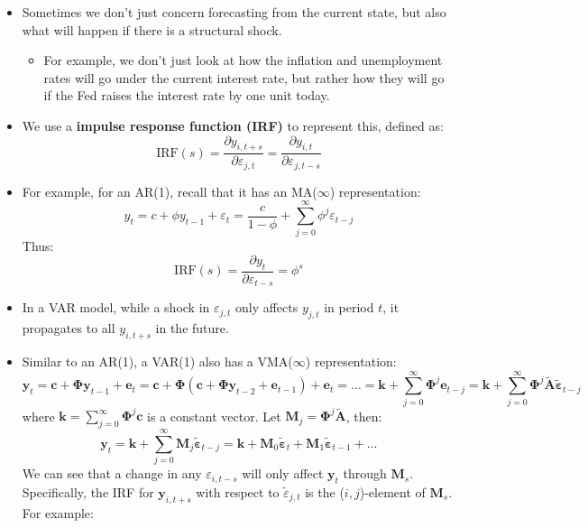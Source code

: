 \documentclass[notitlepage]{article}
\begin{document}
\begin{itemize}
    \item Sometimes we don't just concern forecasting from the current state, but also what will happen if there is a structural shock.
    \begin{itemize}
        \item For example, we don't just look at how the inflation and unemployment rates will go under the current interest rate, but rather how they will go if the Fed raises the interest rate by one unit today. 
    \end{itemize}
    \item We use a \textbf{impulse response function (IRF)} to represent this, defined as:
    \[
    \text{IRF}(s) = \frac{\partial y_{i, t+s}}{\partial \varepsilon_{j, t}} = \frac{\partial y_{i, t}}{\partial \varepsilon_{j, t-s}}
    \]
    \item For example, for an AR(1), recall that it has an MA(\(\infty\)) representation:
    \[
    y_t = c + \phi y_{t-1} + \varepsilon_t = \frac{c}{1-\phi} + \sum_{j=0}^\infty \phi^j \varepsilon_{t-j}
    \]
    Thus:
    \[
    \text{IRF}(s) = \frac{\partial y_{t}}{\partial \varepsilon_{t-s}} = \phi^s
    \]
    \item In a VAR model, while a shock in \(\varepsilon_{j,t}\) only affects \(y_{j,t}\) in period \(t\), it propagates to all \(y_{i,t+s}\) in the future.


    \item Similar to an AR(1), a VAR(1) also has a VMA(\(\infty\)) representation:
    \[
        \mathbf{y}_t = \mathbf{c} + \boldsymbol{\Phi}\mathbf{y}_{t-1} + \mathbf{e}_t 
        =\mathbf{c} + \boldsymbol{\Phi}(\mathbf{c} + \boldsymbol{\Phi}\mathbf{y}_{t-2} + \mathbf{e}_{t-1}) + \mathbf{e}_t
        = \dots
        = \mathbf{k} + \sum_{j=0}^\infty \boldsymbol{\Phi}^j\mathbf{e}_{t-j} 
        = \mathbf{k} + \sum_{j=0}^\infty \boldsymbol{\Phi}^j\tilde{\mathbf{A}} \tilde{\boldsymbol{\varepsilon}}_{t-j}
    \]
    where \(\mathbf{k} = \sum_{j=0}^\infty \boldsymbol{\Phi}^j \mathbf{c}\) is a constant vector. Let \(\mathbf{M}_j = \boldsymbol{\Phi}^j\tilde{\mathbf{A}}\), then:
    \[
    \mathbf{y}_t = \mathbf{k} + \sum_{j=0}^\infty \mathbf{M}_j \tilde{\boldsymbol{\varepsilon}}_{t-j} = \mathbf{k} + \mathbf{M}_0 \tilde{\boldsymbol{\varepsilon}}_t + \mathbf{M}_1 \tilde{\boldsymbol{\varepsilon}}_{t-1} + \dots
    \]
    We can see that a change in any \(\varepsilon_{i,t-s}\) will only affect \(\mathbf{y}_{t}\) through \(\mathbf{M}_s\). Specifically, the IRF for \(\mathbf{y}_{i,t+s}\) with respect to \(\tilde{\varepsilon}_{j,t}\) is the (\(i,j\))-element of \(\mathbf{M}_s\). For example:


\end{itemize}
\end{document}
